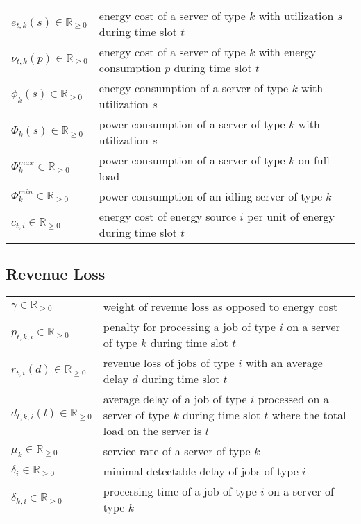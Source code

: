\begin{tabularx}{\textwidth}{lX}
    $e_{t,k}(s) \in \mathbb{R}_{\geq 0}$ & energy cost of a server of type $k$ with utilization $s$ during time slot $t$ \\
    $\nu_{t,k}(p) \in \mathbb{R}_{\geq 0}$ & energy cost of a server of type $k$ with energy consumption $p$ during time slot $t$ \\
    $\phi_k(s) \in \mathbb{R}_{\geq 0}$ & energy consumption of a server of type $k$ with utilization $s$ \\
    $\Phi_k(s) \in \mathbb{R}_{\geq 0}$ & power consumption of a server of type $k$ with utilization $s$ \\
    $\Phi_k^{max} \in \mathbb{R}_{\geq 0}$ & power consumption of a server of type $k$ on full load \\
    $\Phi_k^{min} \in \mathbb{R}_{\geq 0}$ & power consumption of an idling server of type $k$ \\
    $c_{t,i} \in \mathbb{R}_{\geq 0}$ & energy cost of energy source $i$ per unit of energy during time slot $t$ \\
\end{tabularx}

\subsection*{Revenue Loss}

\begin{tabularx}{\textwidth}{lX}
    $\gamma \in \mathbb{R}_{\geq 0}$ & weight of revenue loss as opposed to energy cost \\
    $p_{t,k,i} \in \mathbb{R}_{\geq 0}$ & penalty for processing a job of type $i$ on a server of type $k$ during time slot $t$ \\
    $r_{t,i}(d) \in \mathbb{R}_{\geq 0}$ & revenue loss of jobs of type $i$ with an average delay $d$ during time slot $t$ \\
    $d_{t,k,i}(l) \in \mathbb{R}_{\geq 0}$ & average delay of a job of type $i$ processed on a server of type $k$ during time slot $t$ where the total load on the server is $l$ \\
    $\mu_k \in \mathbb{R}_{\geq 0}$ & service rate of a server of type $k$ \\
    $\delta_i \in \mathbb{R}_{\geq 0}$ & minimal detectable delay of jobs of type $i$ \\
    $\delta_{k,i} \in \mathbb{R}_{\geq 0}$ & processing time of a job of type $i$ on a server of type $k$ \\
\end{tabularx}

